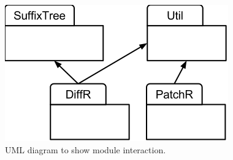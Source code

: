\begin{figure}[H]
\begin{center}
\includegraphics[width=\textwidth]{design/diffrUML-packages.png}
\end{center}
\caption{UML diagram to show module interaction.}
\label{fig:packagesUML}
\end{figure}



